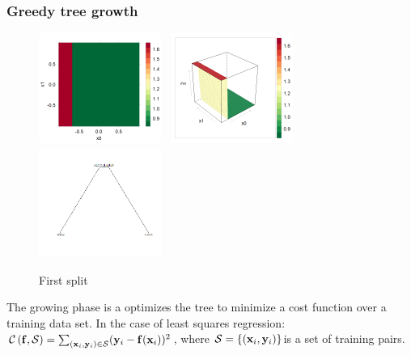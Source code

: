 \documentclass[11pt,openany,american,usenames,dvipsnames,svgnames,x11names,table,isodate]{article}
\numberwithin{equation}{section}
\numberwithin{figure}{section}
\begin{document}
\subsubsection{Greedy tree growth}

\begin{figure}
\noindent \begin{centering}
\includegraphics[width=40mm]{fig/rpart-1-split-levelplot}~
\includegraphics[width=40mm]{fig/rpart-1-split-wireframe}~
\includegraphics[width=40mm]{fig/rpart-1-split-tree}
\par\end{centering}

\protect\caption{\label{fig:one-split}First split}
\end{figure}


The growing phase is a optimizes the tree to minimize a cost function
over a training data set. In the case of least squares regression:
$\mathcal{C}\left({\mathbf f},\mathcal{S}\right)=\sum_{({\mathbf x}_{i},{\mathbf y}_{i})\in\mathcal{S}}({\mathbf y}_{i}-{\mathbf f}({\mathbf x}_{i}))^{2}$,
where $\mathcal{S}=\left\{ ({\mathbf x}_{i},{\mathbf y}_{i})\right\} $is a set of training
pairs.
\end{document}
